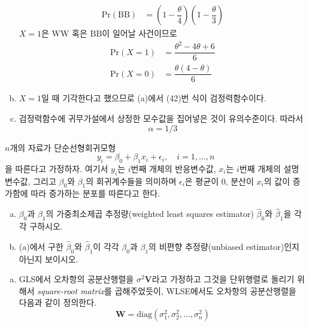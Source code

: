 \documentclass[answers]{exam}
\begin{document}
\begin{questions}
\begin{solution}
\begin{enumerate}[(a)]
\begin{align}
          \mathrm{Pr}\left(\mathrm{BB}\right) &= \left(1-\dfrac{\theta}{4}\right)\left(1-\dfrac{\theta}{3}\right)
        \end{align}
        $X=1$은 $\mathrm{WW}$ 혹은 $\mathrm{BB}$이 일어날 사건이므로
        \begin{align}
          \mathrm{Pr}\left(X=1\right) &= \dfrac{\theta^{2}-4\theta+6}{6}\\
          \mathrm{Pr}\left(X=0\right) &= \dfrac{\theta\left(4-\theta\right)}{6}
        \end{align}
        \item $X=1$일 때 기각한다고 했으므로 (a)에서 (42)번 식이 검정력함수이다.
        \item 검정력함수에 귀무가설에서 상정한 모수값을 집어넣은 것이 유의수준이다. 따라서
        \begin{equation}
          \alpha = 1/3
        \end{equation}
      \end{enumerate}
    \end{solution}
    \question
    $n$개의 자료가 단순선형회귀모형
    \begin{equation}
      y_{i} = \beta_{0}+\beta_{1}x_{i}+\epsilon_{i},\quad i=1,\ldots,n
    \end{equation}
    을 따른다고 가정하자. 여기서 $y_{i}$는 $i$번째 개체의 반응변수값, $x_{i}$는 $i$번째 개체의 설명변수값, 그리고 $\beta_{0}$와 $\beta_{1}$의 회귀계수들을 의미하며 $\epsilon_{i}$은 평균이 $0$, 분산이 $x_{i}$의 값이 증가함에 따라 증가하는 분포를 따른다고 한다.
    \begin{enumerate}[(a)]
      \item $\beta_{0}$과 $\beta_{1}$의 가중최소제곱 추정량(weighted least squares estimator) $\widehat{\beta}_{0}$와 $\widehat{\beta}_{1}$을 각각 구하시오.
      \item (a)에서 구한 $\widehat{\beta}_{0}$와 $\widehat{\beta}_{1}$이 각각 $\beta_{0}$과 $\beta_{1}$의 비편향 추정량(unbiased estimator)인지 아닌지 보이시오.
    \end{enumerate}
    \begin{solution}
      \begin{enumerate}[(a)]
        \item GLS에서 오차항의 공분산행렬을 $\sigma^{2}\mathbf{V}$라고 가정하고 그것을 단위행렬로 돌리기 위해서 \emph{square-root matrix}를 곱해주었듯이, WLSE에서도 오차항의 공분산행렬을 다음과 같이 정의한다.
        \begin{equation}
          \mathbf{W} = \mathrm{diag}\left(\sigma_{1}^{2},\sigma_{2}^{2},\ldots,\sigma_{n}^{2}\right)

\end{equation}
\end{enumerate}
\end{solution}
\end{questions}
\end{document}
